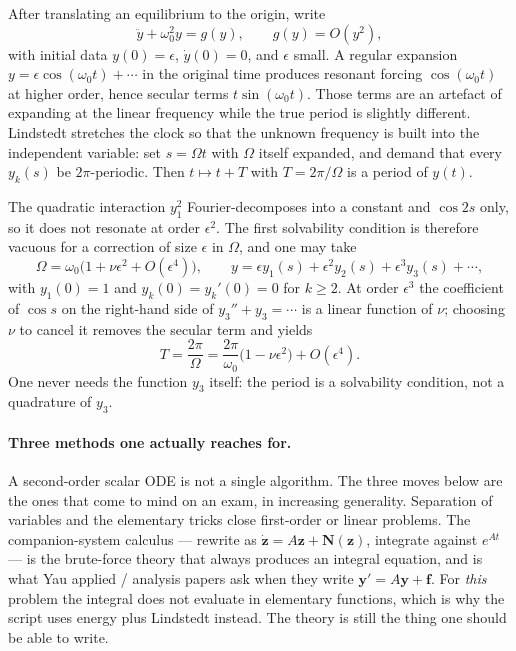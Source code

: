 \documentclass[11pt,a4paper]{article}
\begin{document}
\begin{construction}
\label{con:lindstedt}
After translating an equilibrium to the origin, write
\[
\ddot y+\omega_{0}^{2} y=g(y),\qquad g(y)=O(y^{2}),
\]
with initial data \(y(0)=\epsilon\), \(\dot y(0)=0\), and \(\epsilon\) small. A regular expansion \(y=\epsilon\cos(\omega_{0} t)+\cdots\) in the original time produces resonant forcing \(\cos(\omega_{0} t)\) at higher order, hence secular terms \(t\sin(\omega_{0} t)\). Those terms are an artefact of expanding at the linear frequency while the true period is slightly different. Lindstedt stretches the clock so that the unknown frequency is built into the independent variable: set \(s=\Omega t\) with \(\Omega\) itself expanded, and demand that every \(y_{k}(s)\) be \(2\pi\)-periodic. Then \(t\mapsto t+T\) with \(T=2\pi/\Omega\) is a period of \(y(t)\).

The quadratic interaction \(y_{1}^{2}\) Fourier-decomposes into a constant and \(\cos 2s\) only, so it does not resonate at order \(\epsilon^{2}\). The first solvability condition is therefore vacuous for a correction of size \(\epsilon\) in \(\Omega\), and one may take
\[
\Omega=\omega_{0}\bigl(1+\nu\epsilon^{2}+O(\epsilon^{4})\bigr),\qquad
y=\epsilon y_{1}(s)+\epsilon^{2} y_{2}(s)+\epsilon^{3} y_{3}(s)+\cdots,
\]
with \(y_{1}(0)=1\) and \(y_{k}(0)=y_{k}'(0)=0\) for \(k\ge 2\). At order \(\epsilon^{3}\) the coefficient of \(\cos s\) on the right-hand side of \(y_{3}''+y_{3}=\cdots\) is a linear function of \(\nu\); choosing \(\nu\) to cancel it removes the secular term and yields
\[
T=\frac{2\pi}{\Omega}=\frac{2\pi}{\omega_{0}}\bigl(1-\nu\epsilon^{2}\bigr)+O(\epsilon^{4}).
\]
One never needs the function \(y_{3}\) itself: the period is a solvability condition, not a quadrature of \(y_{3}\).
\end{construction}

\paragraph{Three methods one actually reaches for.}

A second-order scalar ODE is not a single algorithm. The three moves below are the ones that come to mind on an exam, in increasing generality. Separation of variables and the elementary tricks close first-order or linear problems. The companion-system calculus --- rewrite as \(\dot{\mathbf{z}}=A\mathbf{z}+\mathbf{N}(\mathbf{z})\), integrate against \(e^{At}\) --- is the brute-force theory that always produces an integral equation, and is what Yau applied / analysis papers ask when they write \(\mathbf{y}'=A\mathbf{y}+\mathbf{f}\). For \emph{this} problem the integral does not evaluate in elementary functions, which is why the script uses energy plus Lindstedt instead. The theory is still the thing one should be able to write.
\end{document}
